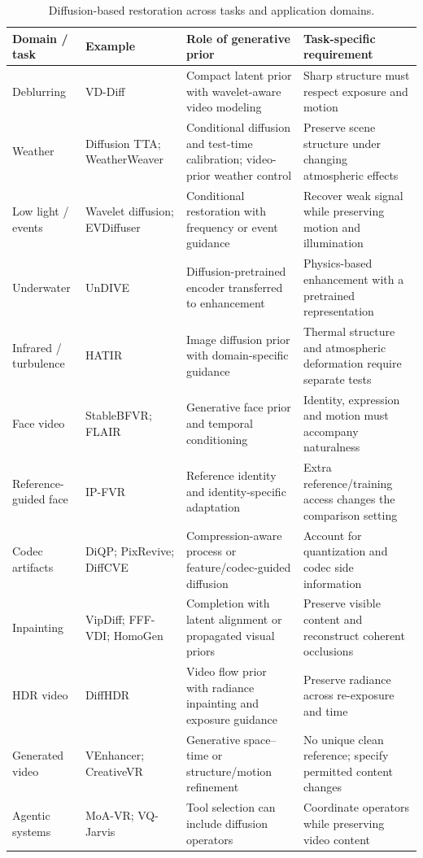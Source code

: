 \begin{table}[t]
\caption{Diffusion-based restoration across tasks and application domains.}
\label{tab:domains}\centering\footnotesize
\begin{tabularx}{\textwidth}{@{}p{}>{\raggedright\arraybackslash}p{}YY@{}}\toprule
Domain / task & Example & Role of generative prior & Task-specific requirement \\\midrule
Deblurring & VD-Diff~\cite{vddiff} & Compact latent prior with wavelet-aware video modeling & Sharp structure must respect exposure and motion \\
Weather & Diffusion TTA; WeatherWeaver~\cite{difftta,weatherweaver} & Conditional diffusion and test-time calibration; video-prior weather control & Preserve scene structure under changing atmospheric effects \\
Low light / events & Wavelet diffusion; EVDiffuser~\cite{lowlight,evdiffuser} & Conditional restoration with frequency or event guidance & Recover weak signal while preserving motion and illumination \\
Underwater & UnDIVE~\cite{undive} & Diffusion-pretrained encoder transferred to enhancement & Physics-based enhancement with a pretrained representation \\
Infrared / turbulence & HATIR~\cite{hatir} & Image diffusion prior with domain-specific guidance & Thermal structure and atmospheric deformation require separate tests \\
Face video & StableBFVR; FLAIR~\cite{stablebfvr,flair} & Generative face prior and temporal conditioning & Identity, expression and motion must accompany naturalness \\
Reference-guided face & IP-FVR~\cite{ipfvr} & Reference identity and identity-specific adaptation & Extra reference/training access changes the comparison setting \\
Codec artifacts & DiQP; PixRevive; DiffCVE~\cite{diqp,pixrevive,diffcve} & Compression-aware process or feature/codec-guided diffusion & Account for quantization and codec side information \\
Inpainting & VipDiff; FFF-VDI; HomoGen~\cite{vipdiff,fffvdi,homogen} & Completion with latent alignment or propagated visual priors & Preserve visible content and reconstruct coherent occlusions \\
HDR video & DiffHDR~\cite{diffhdr} & Video flow prior with radiance inpainting and exposure guidance & Preserve radiance across re-exposure and time \\
Generated video & VEnhancer; CreativeVR~\cite{venhancer,creativevr} & Generative space--time or structure/motion refinement & No unique clean reference; specify permitted content changes \\
Agentic systems & MoA-VR; VQ-Jarvis~\cite{moavr,vqjarvis} & Tool selection can include diffusion operators & Coordinate operators while preserving video content \\\bottomrule
\end{tabularx}
\end{table}

